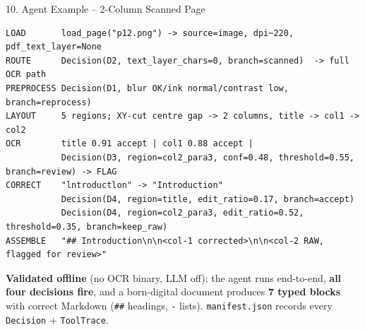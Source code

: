 \documentclass[10pt,aspectratio=169]{beamer}
\begin{document}
\begin{frame}[fragile]{10. Agent Example -- 2-Column Scanned Page}
\begin{lstlisting}[basicstyle=\ttfamily\tiny]
LOAD       load_page("p12.png") -> source=image, dpi~220, pdf_text_layer=None
ROUTE      Decision(D2, text_layer_chars=0, branch=scanned)  -> full OCR path
PREPROCESS Decision(D1, blur OK/ink normal/contrast low, branch=reprocess)
LAYOUT     5 regions; XY-cut centre gap -> 2 columns, title -> col1 -> col2
OCR        title 0.91 accept | col1 0.88 accept |
           Decision(D3, region=col2_para3, conf=0.48, threshold=0.55, branch=review) -> FLAG
CORRECT    "lntroductlon" -> "Introduction"
           Decision(D4, region=title, edit_ratio=0.17, branch=accept)
           Decision(D4, region=col2_para3, edit_ratio=0.52, threshold=0.35, branch=keep_raw)
ASSEMBLE   "## Introduction\n\n<col-1 corrected>\n\n<col-2 RAW, flagged for review>"
\end{lstlisting}

\scriptsize \textbf{Validated offline} (no OCR binary, LLM off): the agent runs end-to-end, \textbf{all four decisions fire}, and a born-digital document produces \textbf{7 typed blocks} with correct Markdown (\texttt{\#\#} headings, \texttt{-} lists). \texttt{manifest.json} records every \texttt{Decision} + \texttt{ToolTrace}.
\end{frame}
\end{document}

